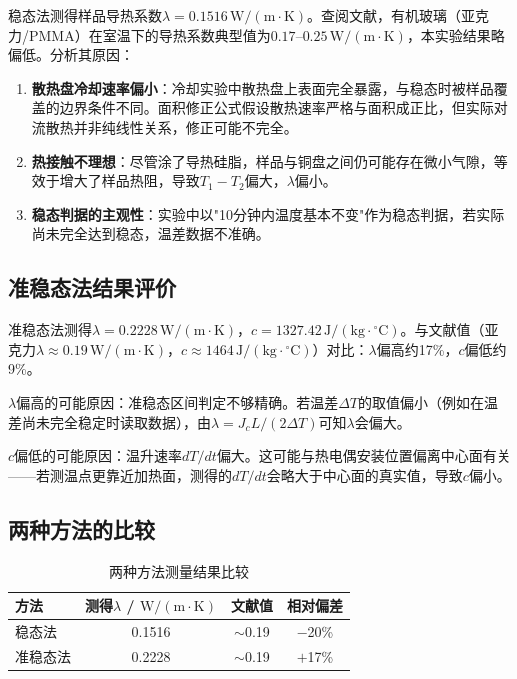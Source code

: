 \documentclass[UTF8]{article}
\begin{document}
稳态法测得样品导热系数$\lambda = 0.1516\,\mathrm{W/(m\cdot K)}$。查阅文献，有机玻璃（亚克力/PMMA）在室温下的导热系数典型值为$0.17$--$0.25\,\mathrm{W/(m\cdot K)}$，本实验结果略偏低。分析其原因：

\begin{enumerate}
    \item \textbf{散热盘冷却速率偏小}：冷却实验中散热盘上表面完全暴露，与稳态时被样品覆盖的边界条件不同。面积修正公式假设散热速率严格与面积成正比，但实际对流散热并非纯线性关系，修正可能不完全。
    \item \textbf{热接触不理想}：尽管涂了导热硅脂，样品与铜盘之间仍可能存在微小气隙，等效于增大了样品热阻，导致$T_1-T_2$偏大，$\lambda$偏小。
    \item \textbf{稳态判据的主观性}：实验中以"10分钟内温度基本不变"作为稳态判据，若实际尚未完全达到稳态，温差数据不准确。
\end{enumerate}

\subsection{准稳态法结果评价}

准稳态法测得$\lambda = 0.2228\,\mathrm{W/(m\cdot K)}$，$c = 1327.42\,\mathrm{J/(kg\cdot{^{\circ}C})}$。与文献值（亚克力$\lambda\approx 0.19\,\mathrm{W/(m\cdot K)}$，$c\approx 1464\,\mathrm{J/(kg\cdot{^{\circ}C})}$）对比：$\lambda$偏高约17\%，$c$偏低约9\%。

$\lambda$偏高的可能原因：准稳态区间判定不够精确。若温差$\Delta T$的取值偏小（例如在温差尚未完全稳定时读取数据），由$\lambda = J_c L/(2\Delta T)$可知$\lambda$会偏大。

$c$偏低的可能原因：温升速率$dT/dt$偏大。这可能与热电偶安装位置偏离中心面有关——若测温点更靠近加热面，测得的$dT/dt$会略大于中心面的真实值，导致$c$偏小。

\subsection{两种方法的比较}

\begin{table}[h]
\centering
\caption{两种方法测量结果比较}
\label{tab:compare}
\begin{tabular}{lccc}
\toprule
方法 & 测得$\lambda$ / $\mathrm{W/(m\cdot K)}$ & 文献值 & 相对偏差 \\
\midrule
稳态法 & 0.1516 & $\sim$0.19 & $-$20\% \\
准稳态法 & 0.2228 & $\sim$0.19 & $+$17\% \\
\bottomrule
\end{tabular}
\end{table}
\end{document}
